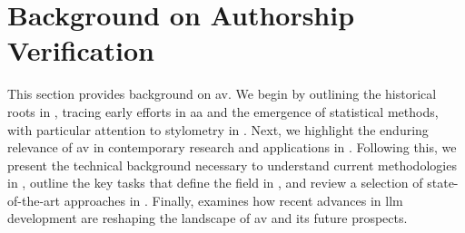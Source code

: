\chapter{Background on Authorship Verification}
\label{chap:authorship_identification}

This section provides background on \acf{av}.
We begin by outlining the historical roots in , tracing early efforts in \ac{aa} and the emergence of statistical methods, with particular attention to stylometry in .
Next, we highlight the enduring relevance of \ac{av} in contemporary research and applications in .
Following this, we present the technical background necessary to understand current methodologies in , outline the key tasks that define the field in , and review a selection of state-of-the-art approaches in .
Finally,  examines how recent advances in \ac{llm} development are reshaping the landscape of \ac{av} and its future prospects.










% 



